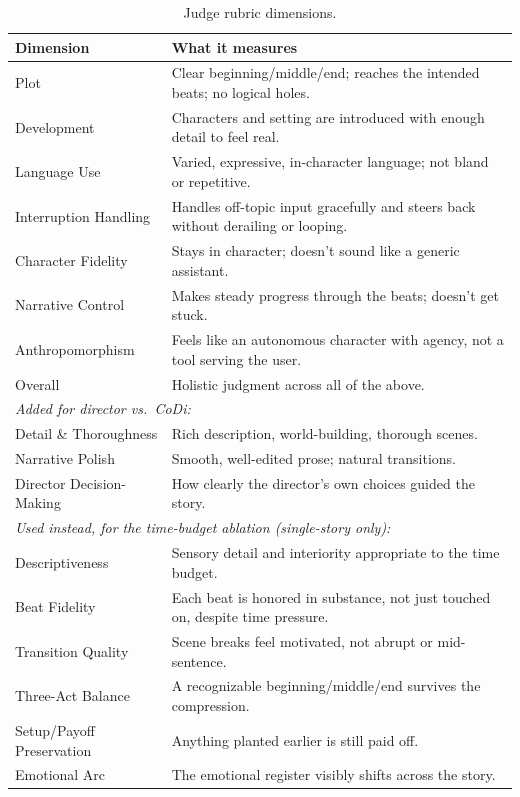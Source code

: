 \documentclass[10pt]{article}
\begin{document}
\begin{table}[htbp]
\centering
\caption{Judge rubric dimensions.}
\label{tab:rubric}
\small
\begin{tabular}{p{3.3cm}p{10.5cm}}
\toprule
Dimension & What it measures \\
\midrule
Plot & Clear beginning/middle/end; reaches the intended beats; no logical holes. \\
Development & Characters and setting are introduced with enough detail to feel real. \\
Language Use & Varied, expressive, in-character language; not bland or repetitive. \\
Interruption Handling & Handles off-topic input gracefully and steers back without derailing or looping. \\
Character Fidelity & Stays in character; doesn't sound like a generic assistant. \\
Narrative Control & Makes steady progress through the beats; doesn't get stuck. \\
Anthropomorphism & Feels like an autonomous character with agency, not a tool serving the user. \\
Overall & Holistic judgment across all of the above. \\
\midrule
\multicolumn{2}{l}{\textit{Added for director vs.\ CoDi:}} \\
Detail \& Thoroughness & Rich description, world-building, thorough scenes. \\
Narrative Polish & Smooth, well-edited prose; natural transitions. \\
Director Decision-Making & How clearly the director's own choices guided the story. \\
\midrule
\multicolumn{2}{l}{\textit{Used instead, for the time-budget ablation (single-story only):}} \\
Descriptiveness & Sensory detail and interiority appropriate to the time budget. \\
Beat Fidelity & Each beat is honored in substance, not just touched on, despite time pressure. \\
Transition Quality & Scene breaks feel motivated, not abrupt or mid-sentence. \\
Three-Act Balance & A recognizable beginning/middle/end survives the compression. \\
Setup/Payoff Preservation & Anything planted earlier is still paid off. \\
Emotional Arc & The emotional register visibly shifts across the story. \\
\bottomrule
\end{tabular}
\end{table}
\end{document}
